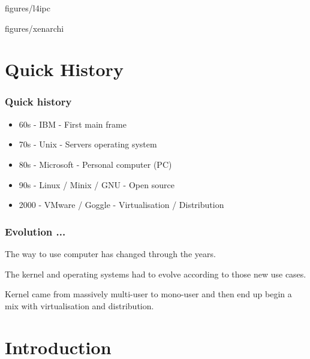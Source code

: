                 {figures/l4ipc}

                {figures/xenarchi}

%
%

\section{Quick History}

\begin{frame}
\frametitle{Quick history}

        \begin{itemize}
                \item 60s - IBM - First main frame
                \item 70s - Unix - Servers operating system 
                \item 80s - Microsoft  - Personal computer (PC)
                \item 90s - Linux / Minix / GNU - Open source
                \item 2000 - VMware / Goggle - Virtualisation / Distribution 
        \end{itemize}

\end{frame}

\begin{frame}
\frametitle{Evolution ...}
The way to use computer has changed through the years.

  \-

The kernel and operating systems had to evolve according to those new
use cases.

  \-

Kernel came from massively multi-user to mono-user and then end up begin a mix with virtualisation and distribution.
\end{frame}

\section{Introduction}


